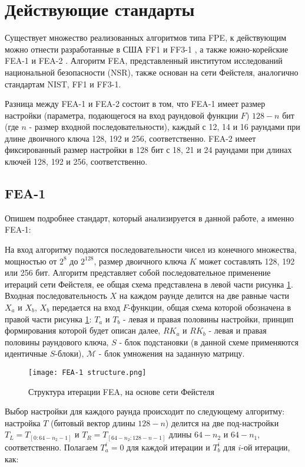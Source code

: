 \documentclass[utf8x, 14pt]{G7-32} %
\begin{document}
\section{Действующие стандарты} %
Существует множество реализованных алгоритмов типа FPE, к действующим можно отнести разработанные в США FF1 и FF3-1 \cite{FF13-1}, а также южно-корейские FEA-1 и FEA-2 \cite{FEA}.
Алгоритм FEA, представленный институтом исследований национальной безопасности (NSR), также основан на сети Фейстеля, аналогично стандартам NIST, FF1 и FF3-1. 


Разница между FEA-1 и FEA-2 состоит в том, что FEA-1 имеет размер настройки (параметра, подающегося на вход раундовой функции $F$) $128-n$ бит (где $n$ - размер входной последовательности), каждый с 12, 14 и 16 раундами при длине двоичного ключа 128, 192 и 256, соответственно. FEA-2 имеет фиксированный размер настройки в 128 бит с 18, 21 и 24 раундами при длинах ключей 128, 192 и 256, соответственно.

\subsection{FEA-1}
Опишем подробнее стандарт, который анализируется в данной работе, а именно FEA-1:

На вход алгоритму подаются последовательности чисел из конечного множества, мощностью от $2^8$ до $2^{128}$, размер двоичного ключа $K$ может составлять 128, 192 или 256 бит. Алгоритм представляет собой последовательное применение итераций сети Фейстеля, ее общая схема представлена в левой части рисунка \ref{fig:fea_structure}. Входная последовательность $X$ на каждом раунде делится на две равные части $X_a$ и $ X_b$, $X_b$ передается на вход $F$-функции, общая схема которой обозначена в правой части рисунка \ref{fig:fea_structure}: $T_a$ и $T_b$ - левая и правая половины настройки, принцип формирования которой будет описан далее, $RK_a$ и $RK_b$ - левая и правая половины раундового ключа, $S$ - блок подстановки (в данной схеме применяются идентичные $S$-блоки), $\mathcal{M}$ - блок умножения на заданную матрицу.

\begin{figure}[h!]
	\texttt{[image: FEA-1 structure.png]}
	\caption{Структура итерации FEA, на основе сети Фейстеля}
	\label{fig:fea_structure}
\end{figure}

Выбор настройки для каждого раунда происходит по следующему алгоритму: настройка $T$ (битовый вектор длины $128-n$) делится на две под-настройки $T_L = T_{ [ 0:64-n_2-1 ] }$ и $T_R=T_{ [ 64-n_2:128-n-1 ] }$ длины $64-n_2$ и $64-n_1$, соответственно. Полагаем $T_a^i=0$ для каждой итерации и $T_b^i$ для $i$-ой итерации, как:
\end{document}
